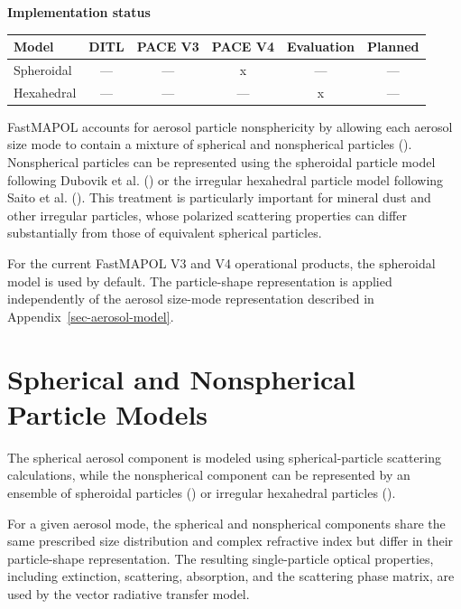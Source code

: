 \documentclass[
  11pt,
  letterpaper,
]{scrreprt}
\begin{document}
\textbf{Implementation status}

\begin{longtable}[]{@{}lccccc@{}}
\toprule\noalign{}
Model & DITL & PACE V3 & PACE V4 & Evaluation & Planned \\
\midrule\noalign{}
\endhead
\bottomrule\noalign{}
\endlastfoot
Spheroidal & --- & --- & x & --- & --- \\
Hexahedral & --- & --- & --- & x & --- \\
\end{longtable}

FastMAPOL accounts for aerosol particle nonsphericity by allowing each
aerosol size mode to contain a mixture of spherical and nonspherical
particles (). Nonspherical
particles can be represented using the spheroidal particle model
following Dubovik et al. () or the
irregular hexahedral particle model following Saito et al.
(). This treatment is particularly
important for mineral dust and other irregular particles, whose
polarized scattering properties can differ substantially from those of
equivalent spherical particles.

For the current FastMAPOL V3 and V4 operational products, the spheroidal
model is used by default. The particle-shape representation is applied
independently of the aerosol size-mode representation described in
Appendix~\ref{sec-aerosol-model}.

\section{Spherical and Nonspherical Particle
Models}\label{spherical-and-nonspherical-particle-models}

The spherical aerosol component is modeled using spherical-particle
scattering calculations, while the nonspherical component can be
represented by an ensemble of spheroidal particles
() or irregular
hexahedral particles ().

For a given aerosol mode, the spherical and nonspherical components
share the same prescribed size distribution and complex refractive index
but differ in their particle-shape representation. The resulting
single-particle optical properties, including extinction, scattering,
absorption, and the scattering phase matrix, are used by the vector
radiative transfer model.
\end{document}
